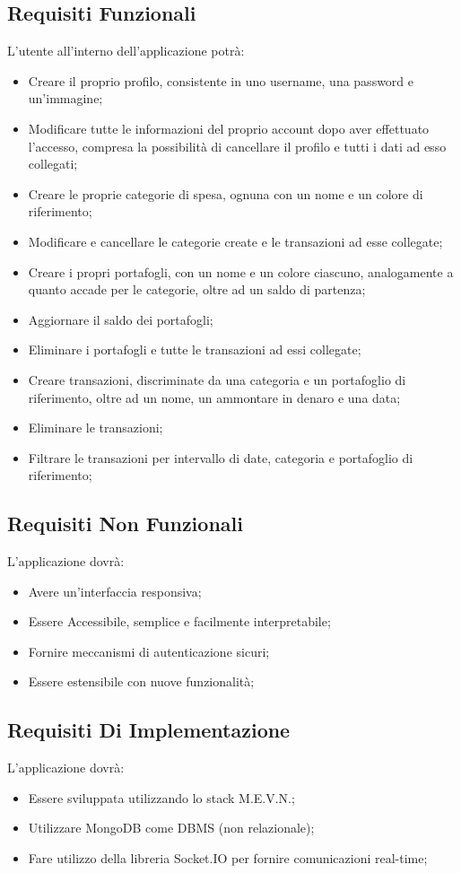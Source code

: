 \documentclass{report}
\begin{document}
\subsection{Requisiti Funzionali}
L’utente all’interno dell’applicazione potrà:
\begin{itemize}
    \item   Creare il proprio profilo, consistente in uno username, una password e un’immagine;
    \item	Modificare tutte le informazioni del proprio account dopo aver effettuato l’accesso, compresa la possibilità di cancellare il profilo e tutti i dati ad esso collegati;
    \item	Creare le proprie categorie di spesa, ognuna con un nome e un colore di riferimento;
    \item	Modificare e cancellare le categorie create e le transazioni ad esse collegate;
    \item	Creare i propri portafogli, con un nome e un colore ciascuno, analogamente a quanto accade per le categorie, oltre ad un saldo di partenza;
    \item	Aggiornare il saldo dei portafogli;
    \item	Eliminare i portafogli e tutte le transazioni ad essi collegate;
    \item	Creare transazioni, discriminate da una categoria e un portafoglio di riferimento, oltre ad un nome, un ammontare in denaro e una data;
    \item	Eliminare le transazioni;
    \item	Filtrare le transazioni per intervallo di date, categoria e portafoglio di riferimento;
\end{itemize}
\newpage

\subsection{Requisiti Non Funzionali}
L’applicazione dovrà:
\begin{itemize}
    \item 	Avere un’interfaccia responsiva;
    \item 	Essere Accessibile, semplice e facilmente interpretabile;
    \item 	Fornire meccanismi di autenticazione sicuri;
    \item 	Essere estensibile con nuove funzionalità;
\end{itemize}

\subsection{Requisiti Di Implementazione}
L’applicazione dovrà:
\begin{itemize}
    \item Essere sviluppata utilizzando lo stack M.E.V.N.;
    \item Utilizzare MongoDB come DBMS (non relazionale);
    \item Fare utilizzo della libreria Socket.IO per fornire comunicazioni real-time;
\end{itemize}
\end{document}
